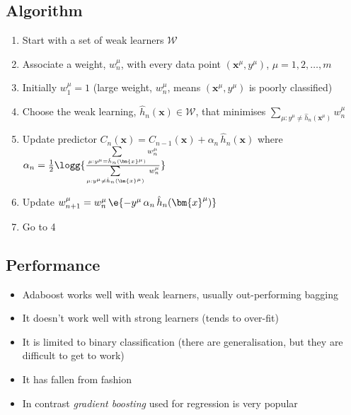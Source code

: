 \begin{slide}
\section[-2]{Algorithm}

\begin{PauseHighLight}
  \small
  \begin{enumerate}
  \item Start with a set of weak learners $\mathcal{W}$\pause
  \item Associate a weight, $w_n^\mu$, with every data point
    $(\bm{x}^\mu, y^\mu)$, $\mu=1,2,\ldots,m$\pause
  \item Initially $w_1^\mu=1$\pause{} (large weight, $w_n^\mu$, means
    $(\bm{x}^\mu, y^\mu)$ is poorly classified)\pauseb
  \item Choose the weak learning, $\hat{h}_n(\bm{x})\in\mathcal{W}$, that minimises
    $\sum\limits_{\mu:y^\mu\neq \hat{h}_n(\bm{x}^\mu)}\!\!\!
    w_n^\mu$\pause
  \item Update predictor $C_n(\bm{x}) = C_{n-1}(\bm{x}) + \alpha_n \,
    \hat{h}_n(\bm{x})$ where $\alpha_n=  \frac{1}{2} \logg{\frac{\sum\limits_{\mu:y^\mu=
      \hat{h}_n(\bm{x}^\mu)}  w_n^\mu}{
                \sum\limits_{\mu:y^\mu\neq \hat{h}_n(\bm{x}^\mu)}\ w_n^\mu}}$\pause
  \item Update $w_{n+1}^\mu = w_{n}^\mu\, \e{-y^\mu\, \alpha_n \, \hat{h}_n(\bm{x}^\mu)}$\pause
  \item Go to 4\pause
  \end{enumerate}
\end{PauseHighLight}

\end{slide}



\begin{slide}
\section{Performance}

\begin{PauseHighLight}
  \begin{itemize}
  \item Adaboost works well with weak learners, usually out-performing
    bagging\pause
  \item It doesn't work well with strong learners (tends to
    over-fit)\pause
  \item It is limited to binary classification (there are
    generalisation, but they are difficult to get to work)\pause
  \item It has fallen from fashion\pause
  \item In contrast \emph{gradient boosting} used for regression is
    very popular\pause
  \end{itemize}
\end{PauseHighLight}

\end{slide}

